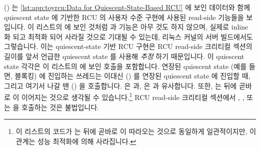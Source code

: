 \begin{fcvref}
()
는
\cref{lst:app:toyrcu:Data for Quiescent-State-Based RCU}
에 보인 데이터와 함께 quiescent state 에 기반한 RCU 의 사용자 수준 구현에
사용된 read-side 기능들을 보입니다.
이 리스트의  에 보인 것처럼 
과  기능은 아무 것도 하지 않으며, 실제로 inline 화 되고
최적화 되어 사라질 것으로 기대될 수 있는데, 리눅스 커널의 서버 빌드에서도
그렇습니다.
이는 quiescent-state 기반 RCU 구현은 RCU read-side 크리티컬 섹션의 길이를 앞서
언급한 quiescent state 를 사용해 \emph{추정} 하기 때문입니다.
이 quiescent state 각각은 이 리스트의  에 보인
 호출을 포함합니다.
연장된 quiescent state (예를 들면, 블록킹) 에 진입하는 쓰레드는 이대신
 () 를 연장된
quiescent state 에 진입할 때, 그리고 여기서 나갈 땐 
() 을 호출합니다.
 은  과,
 은  과 유사합니다.
또한,  는  뒤에 곧바로
 이 이어지는 것으로 생각될 수 있습니다.\footnote{
	이 리스트의 코드가  는
	 뒤에 곧바로  이
	따라오는 것으로 동일하게 일관적이지만, 이 관계는 성능 최적화에 의해
	사라집니다.}
RCU read-side 크리티컬 섹션에서 ,
, 또는  을 호출하는 것은
불법입니다.
\end{fcvref}

\iffalse

